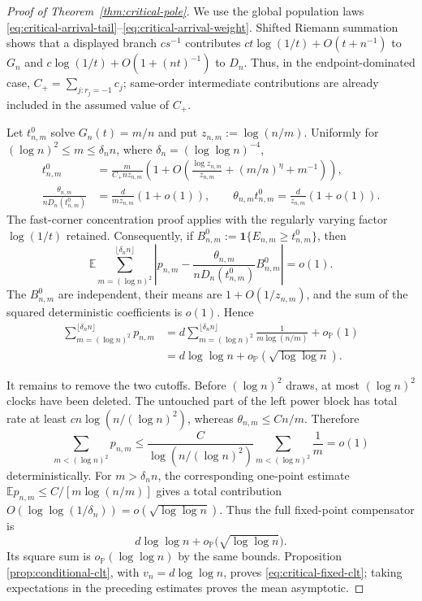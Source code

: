 \documentclass[11pt]{article}
\theoremstyle{remark}
\theoremstyle{plain}
\newcommand{\E}{\mathbb E}
\newcommand{\Pp}{\mathbb P}
\newcommand{\one}{\mathbf 1}
\begin{document}
\begin{proof}[Proof of Theorem~\ref{thm:critical-pole}]
We use the global population laws
\eqref{eq:critical-arrival-tail}--\eqref{eq:critical-arrival-weight}.
Shifted Riemann summation shows that a displayed branch
$cs^{-1}$ contributes $ct\log(1/t)+O(t+n^{-1})$ to $G_n$ and
$c\log(1/t)+O(1+(nt)^{-1})$ to $D_n$.  Thus, in the endpoint-dominated
case, $C_+=\sum_{j:r_j=-1}c_j$; same-order intermediate contributions are
already included in the assumed value of $C_+$.

Let $t^0_{n,m}$ solve $G_n(t)=m/n$ and put
$z_{n,m}:=\log(n/m)$.  Uniformly for
$(\log n)^2\le m\le\delta_n n$, where
$\delta_n=(\log\log n)^{-4}$,
\begin{align}
 t^0_{n,m}&=\frac{m}{C_+n z_{n,m}}
 \left(1+O\left(\frac{\log z_{n,m}}{z_{n,m}}
 +(m/n)^\eta+m^{-1}\right)\right),
 \label{eq:critical-time}\\
 \frac{\theta_{n,m}}{nD_n(t^0_{n,m})}
 &=\frac{d}{m z_{n,m}}(1+o(1)),
 \qquad
 \theta_{n,m}t^0_{n,m}=\frac{d}{z_{n,m}}(1+o(1)).
 \label{eq:critical-hazard}
\end{align}
The fast-corner concentration proof applies with the regularly varying
factor $\log(1/t)$ retained.  Consequently, if
$B^0_{n,m}:=\one\{E_{n,m}\ge t^0_{n,m}\}$, then
\begin{equation}\label{eq:critical-compensator-approximation}
 \E\sum_{m=(\log n)^2}^{\lfloor\delta_n n\rfloor}
 \left|p_{n,m}-
 \frac{\theta_{n,m}}{nD_n(t^0_{n,m})}B^0_{n,m}\right|=o(1).
\end{equation}
The $B^0_{n,m}$ are independent, their means are
$1+O(1/z_{n,m})$, and the sum of the squared deterministic coefficients is
$o(1)$.  Hence
\begin{align}
 \sum_{m=(\log n)^2}^{\lfloor\delta_n n\rfloor}p_{n,m}
 &=d\sum_{m=(\log n)^2}^{\lfloor\delta_n n\rfloor}
 \frac1{m\log(n/m)}+o_{\Pp}(1)\\
 &=d\log\log n+o_{\Pp}(\sqrt{\log\log n}).
 \label{eq:critical-main-compensator}
\end{align}

It remains to remove the two cutoffs.  Before $(\log n)^2$ draws, at most
$(\log n)^2$ clocks have been deleted.  The untouched part of the left
power block has total rate at least $cn\log(n/(\log n)^2)$, whereas
$\theta_{n,m}\le Cn/m$.  Therefore
\[
 \sum_{m< (\log n)^2}p_{n,m}
 \le\frac{C}{\log(n/(\log n)^2)}
 \sum_{m<(\log n)^2}\frac1m=o(1)
\]
deterministically.  For $m>\delta_n n$, the corresponding one-point estimate
$\E p_{n,m}\le C/[m\log(n/m)]$ gives a total contribution
$O(\log\log(1/\delta_n))=o(\sqrt{\log\log n})$.  Thus the full fixed-point
compensator is
\[
 d\log\log n+o_{\Pp}\bigl(\sqrt{\log\log n}\bigr).
\]
Its square sum is $o_{\Pp}(\log\log n)$ by the same bounds.  Proposition
\ref{prop:conditional-clt}, with $v_n=d\log\log n$, proves
\eqref{eq:critical-fixed-clt}; taking expectations in
the preceding estimates proves the mean asymptotic.


\end{proof}
\end{document}
